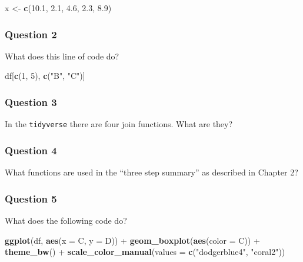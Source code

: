 \documentclass[]{tufte-book}
\newenvironment{Shaded}{}{}
\newcommand{\KeywordTok}[1]{\textcolor[rgb]{0.00,0.44,0.13}{\textbf{#1}}}
\newcommand{\DataTypeTok}[1]{\textcolor[rgb]{0.56,0.13,0.00}{#1}}
\newcommand{\DecValTok}[1]{\textcolor[rgb]{0.25,0.63,0.44}{#1}}
\newcommand{\FloatTok}[1]{\textcolor[rgb]{0.25,0.63,0.44}{#1}}
\newcommand{\StringTok}[1]{\textcolor[rgb]{0.25,0.44,0.63}{#1}}
\newcommand{\OperatorTok}[1]{\textcolor[rgb]{0.40,0.40,0.40}{#1}}
\newcommand{\NormalTok}[1]{#1}
\theoremstyle{definition}
\theoremstyle{definition}
\theoremstyle{remark}
\begin{document}
\begin{Shaded}
\begin{Highlighting}[]
\NormalTok{x <-}\StringTok{ }\KeywordTok{c}\NormalTok{(}\FloatTok{10.1}\NormalTok{, }\FloatTok{2.1}\NormalTok{, }\FloatTok{4.6}\NormalTok{, }\FloatTok{2.3}\NormalTok{, }\FloatTok{8.9}\NormalTok{)}
\end{Highlighting}
\end{Shaded}

\subsubsection*{Question 2}\label{question-2}

What does this line of code do?

\begin{Shaded}
\begin{Highlighting}[]
\NormalTok{df[}\KeywordTok{c}\NormalTok{(}\DecValTok{1}\NormalTok{, }\DecValTok{5}\NormalTok{), }\KeywordTok{c}\NormalTok{(}\StringTok{"B"}\NormalTok{, }\StringTok{"C"}\NormalTok{)]}
\end{Highlighting}
\end{Shaded}

\subsubsection*{Question 3}\label{question-3}

In the \texttt{tidyverse} there are four join functions. What are they?

\subsubsection*{Question 4}\label{question-4}

What functions are used in the ``three step summary'' as described in
Chapter 2?

\subsubsection*{Question 5}\label{question-5}

What does the following code do?

\begin{Shaded}
\begin{Highlighting}[]
\KeywordTok{ggplot}\NormalTok{(df, }\KeywordTok{aes}\NormalTok{(}\DataTypeTok{x =}\NormalTok{ C, }\DataTypeTok{y =}\NormalTok{ D)) }\OperatorTok{+}\StringTok{ }\KeywordTok{geom_boxplot}\NormalTok{(}\KeywordTok{aes}\NormalTok{(}\DataTypeTok{color =}\NormalTok{ C)) }\OperatorTok{+}\StringTok{ }
\StringTok{    }\KeywordTok{theme_bw}\NormalTok{() }\OperatorTok{+}\StringTok{ }\KeywordTok{scale_color_manual}\NormalTok{(}\DataTypeTok{values =} \KeywordTok{c}\NormalTok{(}\StringTok{"dodgerblue4"}\NormalTok{, }
    \StringTok{"coral2"}\NormalTok{))}
\end{Highlighting}
\end{Shaded}
\end{document}
